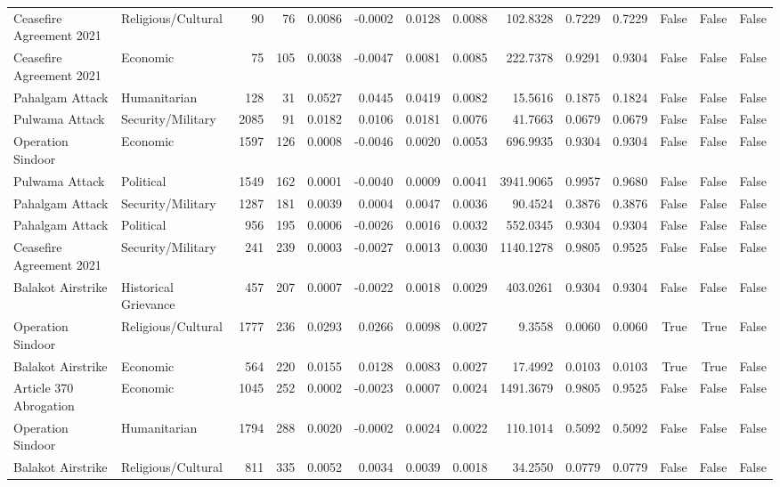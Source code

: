 \begin{longtable}{llrrrrrrrrrrrr}
Ceasefire Agreement 2021 & Religious/Cultural & 90 & 76 & 0.0086 & -0.0002 & 0.0128 & 0.0088 & 102.8328 & 0.7229 & 0.7229 & False & False & False \\
Ceasefire Agreement 2021 & Economic & 75 & 105 & 0.0038 & -0.0047 & 0.0081 & 0.0085 & 222.7378 & 0.9291 & 0.9304 & False & False & False \\
Pahalgam Attack & Humanitarian & 128 & 31 & 0.0527 & 0.0445 & 0.0419 & 0.0082 & 15.5616 & 0.1875 & 0.1824 & False & False & False \\
Pulwama Attack & Security/Military & 2085 & 91 & 0.0182 & 0.0106 & 0.0181 & 0.0076 & 41.7663 & 0.0679 & 0.0679 & False & False & False \\
Operation Sindoor & Economic & 1597 & 126 & 0.0008 & -0.0046 & 0.0020 & 0.0053 & 696.9935 & 0.9304 & 0.9304 & False & False & False \\
Pulwama Attack & Political & 1549 & 162 & 0.0001 & -0.0040 & 0.0009 & 0.0041 & 3941.9065 & 0.9957 & 0.9680 & False & False & False \\
Pahalgam Attack & Security/Military & 1287 & 181 & 0.0039 & 0.0004 & 0.0047 & 0.0036 & 90.4524 & 0.3876 & 0.3876 & False & False & False \\
Pahalgam Attack & Political & 956 & 195 & 0.0006 & -0.0026 & 0.0016 & 0.0032 & 552.0345 & 0.9304 & 0.9304 & False & False & False \\
Ceasefire Agreement 2021 & Security/Military & 241 & 239 & 0.0003 & -0.0027 & 0.0013 & 0.0030 & 1140.1278 & 0.9805 & 0.9525 & False & False & False \\
Balakot Airstrike & Historical Grievance & 457 & 207 & 0.0007 & -0.0022 & 0.0018 & 0.0029 & 403.0261 & 0.9304 & 0.9304 & False & False & False \\
Operation Sindoor & Religious/Cultural & 1777 & 236 & 0.0293 & 0.0266 & 0.0098 & 0.0027 & 9.3558 & 0.0060 & 0.0060 & True & True & False \\
Balakot Airstrike & Economic & 564 & 220 & 0.0155 & 0.0128 & 0.0083 & 0.0027 & 17.4992 & 0.0103 & 0.0103 & True & True & False \\
Article 370 Abrogation & Economic & 1045 & 252 & 0.0002 & -0.0023 & 0.0007 & 0.0024 & 1491.3679 & 0.9805 & 0.9525 & False & False & False \\
Operation Sindoor & Humanitarian & 1794 & 288 & 0.0020 & -0.0002 & 0.0024 & 0.0022 & 110.1014 & 0.5092 & 0.5092 & False & False & False \\
Balakot Airstrike & Religious/Cultural & 811 & 335 & 0.0052 & 0.0034 & 0.0039 & 0.0018 & 34.2550 & 0.0779 & 0.0779 & False & False & False \\

\end{longtable}
